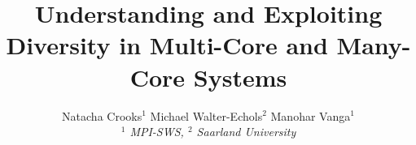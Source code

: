 

\newif \ifDraft\Drafttrue

\ifDraft
  \newcommand{\Comment}[1]{\textbf{\textsl{#1}}}
\else
  \newcommand{\Comment}[1]{\relax}
\fi

\newcommand{\gernot}[1]{\Comment{#1 [gernot]}}


\title{\vspace{-0.8cm}\textbf{
Understanding and Exploiting Diversity in Multi-Core and Many-Core Systems
}}

\author{
Natacha Crooks$^1$ \quad
Michael Walter-Echols$^2$ \quad
Manohar Vanga$^1$
\\ \emph{$^1$ MPI-SWS, $^2$ Saarland University}
}
\date{\vspace{-12pt}}




\maketitle








\fontsize{8}{8.2}
\selectfont


\normalsize

%

